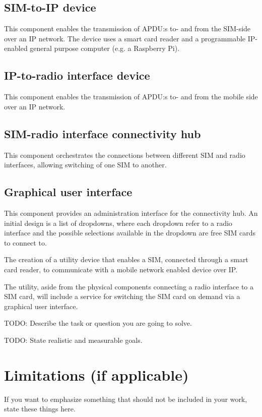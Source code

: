\documentclass[12pt]{article}
\begin{document}
\subsection*{SIM-to-IP device}
This component enables the transmission of APDU:s to- and from
the SIM-side over an IP network. The device uses a smart card
reader and a programmable IP-enabled general purpose computer
(e.g. a Raspberry Pi).

\subsection*{IP-to-radio interface device}
This component enables the transmission of APDU:s to- and from
the mobile side over an IP network.

\subsection*{SIM-radio interface connectivity hub}
This component orchestrates the connections between different SIM
and radio interfaces, allowing switching of one SIM to another.

\subsection*{Graphical user interface}
This component provides an administration interface for the
connectivity hub. An initial design is a list of dropdowns, where
each dropdown refer to a radio interface and the possible
selections available in the dropdown are free SIM cards to connect
to.

The creation of a utility device that enables a SIM, connected
through a smart card reader, to communicate with a mobile network
enabled device over IP.

The utility, aside from the physical components connecting a radio
interface to a SIM card, will include a service for switching the
SIM card on demand via a graphical user interface.

TODO: Describe the task or question you are going to solve.

TODO: State realistic and measurable goals.

\section*{Limitations (if applicable)}
If you want to emphasize something that should not be included
in your work, state these things here.
\end{document}
